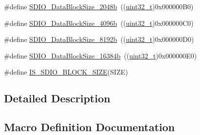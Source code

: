 \begin{DoxyCompactItemize}
\item 
\#define \hyperlink{group___s_d_i_o___data___block___size_ga41eb937621c7ffcf2688c6bc0ea31464}{S\+D\+I\+O\+\_\+\+Data\+Block\+Size\+\_\+2048b}~((\hyperlink{_p_e___types_8h_a33594304e786b158f3fb30289278f5af}{uint32\+\_\+t})0x000000\+B0)
\item 
\#define \hyperlink{group___s_d_i_o___data___block___size_ga360411488abdbaf9eee9b99fca793f79}{S\+D\+I\+O\+\_\+\+Data\+Block\+Size\+\_\+4096b}~((\hyperlink{_p_e___types_8h_a33594304e786b158f3fb30289278f5af}{uint32\+\_\+t})0x000000\+C0)
\item 
\#define \hyperlink{group___s_d_i_o___data___block___size_gaf61913f3eff52c0f728db9ffbdaca7d2}{S\+D\+I\+O\+\_\+\+Data\+Block\+Size\+\_\+8192b}~((\hyperlink{_p_e___types_8h_a33594304e786b158f3fb30289278f5af}{uint32\+\_\+t})0x000000\+D0)
\item 
\#define \hyperlink{group___s_d_i_o___data___block___size_gae80bc49dbed677f7087d523c31fe10ae}{S\+D\+I\+O\+\_\+\+Data\+Block\+Size\+\_\+16384b}~((\hyperlink{_p_e___types_8h_a33594304e786b158f3fb30289278f5af}{uint32\+\_\+t})0x000000\+E0)
\item 
\#define \hyperlink{group___s_d_i_o___data___block___size_ga25ce8d64134659c479d61aa681761948}{I\+S\+\_\+\+S\+D\+I\+O\+\_\+\+B\+L\+O\+C\+K\+\_\+\+S\+I\+ZE}(S\+I\+ZE)
\end{DoxyCompactItemize}


\subsection{Detailed Description}


\subsection{Macro Definition Documentation}
